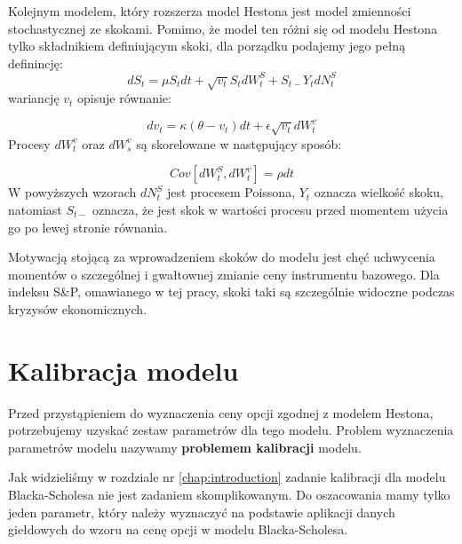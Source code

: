 \documentclass{pracamgr}
\begin{document}
Kolejnym modelem, który rozszerza model Hestona jest model zmienności stochastycznej ze skokami.
Pomimo, że model ten różni się od modelu Hestona tylko składnikiem definiującym skoki, dla
porządku podajemy jego pełną definincję:
\begin{equation}
dS_t  = \mu S_t dt + \sqrt{v_t} S_t dW^S_t + S_{t-} Y_t dN_t^S
\end{equation}
wariancję $v_t$ opisuje równanie: 

\begin{equation}
dv_t  = \kappa (\theta - v_t)dt + \epsilon \sqrt{v_t} dW_t^v 
\end{equation}
Procesy $dW_t^v$ oraz $dW_s^v$ są skorelowane w następujący sposób:

\begin{equation}
Cov[dW^S_t, dW^v_t] = \rho dt 
\end{equation}
W powyższych wzorach $dN_t^S$ jest procesem Poissona, $Y_t$ oznacza wielkość skoku, natomiast $S_{t-}$ oznacza, że jest 
skok w wartości procesu przed momentem użycia go po lewej stronie równania.

Motywacją stojącą za wprowadzeniem skoków do modelu jest chęć uchwycenia momentów o 
szczególnej i gwałtownej zmianie ceny instrumentu bazowego. Dla indeksu S\&P, omawianego w tej pracy,
skoki taki są szczególnie widoczne podczas kryzysów ekonomicznych. 



 


\chapter{Kalibracja modelu}
\label{chap:chapterModelCalibration}



Przed przystąpieniem do wyznaczenia ceny opcji zgodnej z modelem Hestona, potrzebujemy uzyskać zestaw parametrów dla 
tego modelu. Problem wyznaczenia parametrów modelu nazywamy \textbf{problemem kalibracji} modelu.  

Jak widzieliśmy w rozdziale nr \ref{chap:introduction} zadanie kalibracji dla modelu Blacka-Scholesa nie jest 
zadaniem skomplikowanym. Do oszacowania mamy tylko jeden parametr, który należy wyznaczyć na podstawie aplikacji 
danych giełdowych do wzoru na cenę opcji w modelu Blacka-Scholesa.
\end{document}

